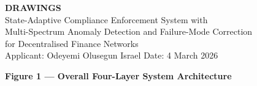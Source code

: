 \documentclass[12pt,a4paper]{article}
\begin{document}
\begin{center}
{\LARGE\bfseries DRAWINGS}\\[0.5em]
{\large State-Adaptive Compliance Enforcement System with\\
Multi-Spectrum Anomaly Detection and Failure-Mode Correction\\
for Decentralised Finance Networks}\\[0.5em]
{\normalsize Applicant: Odeyemi Olusegun Israel \quad Date: 4 March 2026}
\end{center}

\vspace{1em}

\begin{center}
\textbf{Figure 1 --- Overall Four-Layer System Architecture}
\end{center}
\end{document}
